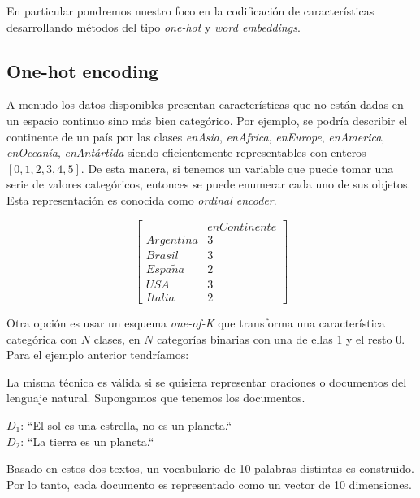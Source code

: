 En particular pondremos nuestro foco en la codificación de características
desarrollando métodos del tipo \emph{one-hot} y \emph{word embeddings}.

\subsection{One-hot encoding}
\label{method:ohe}

A menudo los datos disponibles presentan características que no están dadas en
un espacio continuo sino más bien categórico. Por ejemplo, se podría describir
el continente de un país por las clases \emph{enAsia}, \emph{enAfrica},
\emph{enEurope}, \emph{enAmerica}, \emph{enOceanía}, \emph{enAntártida} siendo
eficientemente representables con enteros $[0, 1, 2, 3, 4, 5]$. De esta manera,
si tenemos un variable que puede tomar una serie de valores categóricos,
entonces se puede enumerar cada uno de sus objetos. Esta representación es
conocida como \emph{ordinal encoder}.

\begin{equation*}
    \begin{bmatrix}
         & enContinente\\
        Argentina & 3 \\
        Brasil & 3 \\
        Espa\tilde{n}a & 2 \\
        USA & 3  \\
        Italia & 2 
    \end{bmatrix}
\end{equation*}

Otra opción es usar un esquema \emph{one-of-K} que transforma una característica
categórica con $N$ clases, en $N$ categorías binarias con una de ellas 1 y el
resto 0. Para el ejemplo anterior tendríamos:

La misma técnica es válida si se quisiera representar oraciones o documentos del
lenguaje natural. Supongamos que tenemos los documentos.

\begin{center}
    $D_1$: ``El sol es una estrella, no es un planeta.`` \\
    $D_2$: ``La tierra es un planeta.``    
\end{center}

Basado en  estos dos textos, un vocabulario de 10 palabras distintas es
construido. Por lo tanto, cada documento es representado como un vector de 10
dimensiones.

\begin{table}[H]
    \centering
\end{table}

